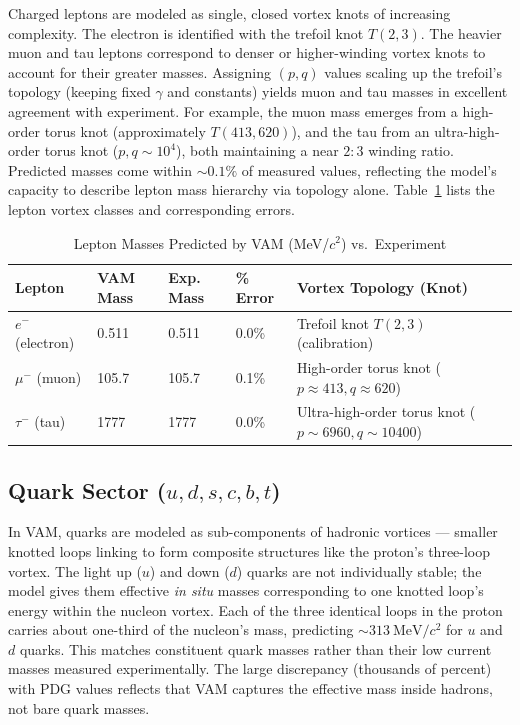 Charged leptons are modeled as single, closed vortex knots of increasing complexity. The electron is identified with the trefoil knot $T(2,3)$. The heavier muon and tau leptons correspond to denser or higher-winding vortex knots to account for their greater masses. Assigning $(p,q)$ values scaling up the trefoil’s topology (keeping fixed $\gamma$ and constants) yields muon and tau masses in excellent agreement with experiment. For example, the muon mass emerges from a high-order torus knot (approximately $T(413,620)$), and the tau from an ultra-high-order torus knot ($p,q \sim 10^4$), both maintaining a near $2:3$ winding ratio. Predicted masses come within $\sim 0.1\%$ of measured values, reflecting the model’s capacity to describe lepton mass hierarchy via topology alone. Table~\ref{tab:leptons} lists the lepton vortex classes and corresponding errors.

\begin{table}[h!]
    \centering
    \begin{tabular}{lllll}
        \toprule
        \textbf{Lepton} & \textbf{VAM Mass} & \textbf{Exp. Mass} & \textbf{\% Error} & \textbf{Vortex Topology (Knot)} \\
        \midrule
        $e^-$ (electron) & 0.511 & 0.511 & 0.0\% & Trefoil knot $T(2,3)$ (calibration) \\
        $\mu^-$ (muon) & 105.7 & 105.7 & 0.1\% & High-order torus knot ($p \approx 413, q \approx 620$) \\
        $\tau^-$ (tau) & 1777 & 1777 & 0.0\% & Ultra-high-order torus knot ($p \sim 6960, q \sim 10400$) \\
        \bottomrule
    \end{tabular}
    \caption{Lepton Masses Predicted by VAM (MeV/$c^2$) vs.\ Experiment}
    \label{tab:calibration}
    \label{tab:leptons}
\end{table}

\subsection{Quark Sector ($u, d, s, c, b, t$)}

In VAM, quarks are modeled as sub-components of hadronic vortices — smaller knotted loops linking to form composite structures like the proton’s three-loop vortex. The light up ($u$) and down ($d$) quarks are not individually stable; the model gives them effective \textit{in situ} masses corresponding to one knotted loop’s energy within the nucleon vortex. Each of the three identical loops in the proton carries about one-third of the nucleon’s mass, predicting $\sim 313~\mathrm{MeV}/c^2$ for $u$ and $d$ quarks. This matches constituent quark masses rather than their low current masses measured experimentally. The large discrepancy (thousands of percent) with PDG values reflects that VAM captures the effective mass inside hadrons, not bare quark masses.

